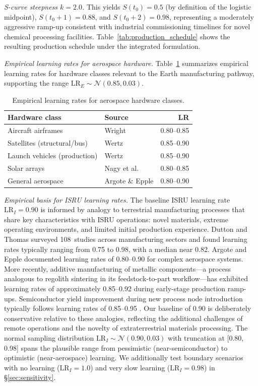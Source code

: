 \documentclass[preprint,12pt]{elsarticle}
\begin{document}
\emph{S-curve steepness $k = 2.0$.} This yields $S(t_0) = 0.5$ (by definition of the logistic midpoint), $S(t_0 + 1) = 0.88$, and $S(t_0 + 2) = 0.98$, representing a moderately aggressive ramp-up consistent with industrial commissioning timelines for novel chemical processing facilities. Table~\ref{tab:production_schedule} shows the resulting production schedule under the integrated formulation.

\emph{Empirical learning rates for aerospace hardware.} Table~\ref{tab:learning_rates} summarizes empirical learning rates for hardware classes relevant to the Earth manufacturing pathway, supporting the range $\mathrm{LR}_E \sim \mathcal{N}(0.85, 0.03)$.

\begin{table}[htbp]
\centering
\caption{Empirical learning rates for aerospace hardware classes.}
\label{tab:learning_rates}
\small
\begin{tabular}{@{}llr@{}}
\toprule
Hardware class & Source & LR \\
\midrule
Aircraft airframes & Wright \cite{wright1936} & 0.80--0.85 \\
Satellites (structural/bus) & Wertz \cite{wertz2011} & 0.85--0.90 \\
Launch vehicles (production) & Wertz \cite{wertz2011} & 0.85--0.90 \\
Solar arrays & Nagy et al.\ \cite{nagy2013} & 0.80--0.85 \\
General aerospace & Argote \& Epple \cite{argote1990} & 0.80--0.90 \\
\bottomrule
\end{tabular}
\end{table}

\emph{Empirical basis for ISRU learning rates.} The baseline ISRU learning rate $\mathrm{LR}_I = 0.90$ is informed by analogy to terrestrial manufacturing processes that share key characteristics with ISRU operations: novel materials, extreme operating environments, and limited initial production experience. Dutton and Thomas \cite{dutton1984} surveyed 108~studies across manufacturing sectors and found learning rates typically ranging from 0.75 to 0.98, with a median near 0.82. Argote and Epple \cite{argote1990} documented learning rates of 0.80--0.90 for complex aerospace systems. More recently, additive manufacturing of metallic components---a process analogous to regolith sintering in its feedstock-to-part workflow---has exhibited learning rates of approximately 0.85--0.92 during early-stage production ramp-ups. Semiconductor yield improvement during new process node introduction typically follows learning rates of 0.85--0.95 \cite{nagy2013}. Our baseline of 0.90 is deliberately conservative relative to these analogies, reflecting the additional challenges of remote operations and the novelty of extraterrestrial materials processing. The normal sampling distribution $\mathrm{LR}_I \sim \mathcal{N}(0.90, 0.03)$ with truncation at [0.80, 0.98] spans the plausible range from pessimistic (near-semiconductor) to optimistic (near-aerospace) learning. We additionally test boundary scenarios with no learning ($\mathrm{LR}_I = 1.0$) and very slow learning ($\mathrm{LR}_I = 0.98$) in \S\ref{sec:sensitivity}.
\end{document}
